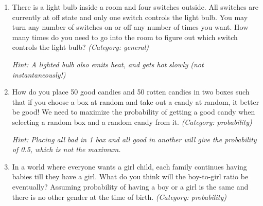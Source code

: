 \begin{enumerate}




\item There is a light bulb inside a room and four switches outside. All switches are currently at off state and only one switch controls the light bulb. You may turn any number of switches on or off any number of times you want. How many times do you need to go into the room to figure out which switch controls the light bulb?
\small\emph{(Category: general)}

\small\emph{Hint: A lighted bulb also emits heat, and gets hot slowly (not instantaneously!)}





\item How do you place 50 good candies and 50 rotten candies in two boxes such that if you choose a box at random and take out a candy at random, it better be good!
We need to maximize the probability of getting a good candy when selecting a random box and a random candy from it.
\small\emph{(Category: probability)}

\small\emph{Hint: Placing all bad in 1 box and all good in another will give the probability of 0.5, which is not the maximum.}





\item In a world where everyone wants a girl child, each family continues having babies till they have a girl. What do you think will the boy-to-girl ratio be eventually?
Assuming probability of having a boy or a girl is the same and there is no other gender at the time of birth.
\small\emph{(Category: probability)}





\end{enumerate}
